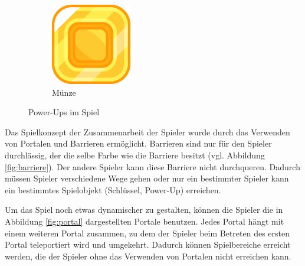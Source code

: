 \begin{figure}[H]
\begin{subfigure}[H]{0.15\textwidth}
        \includegraphics[width=\textwidth]{img/realisierung/assets/coin}
        \caption{Münze}
        \label{fig:coin}
    \end{subfigure}
    \caption{Power-Ups im Spiel}
    \label{fig:eatandcoin}
\end{figure}

Das Spielkonzept der Zusammenarbeit der Spieler wurde durch das Verwenden von Portalen und Barrieren ermöglicht. Barrieren sind nur für den Spieler durchlässig, der die selbe Farbe wie die Barriere besitzt (vgl. Abbildung \ref{fig:barriere}). Der andere Spieler kann diese Barriere nicht durchqueren. Dadurch müssen Spieler verschiedene Wege gehen oder nur ein bestimmter Spieler kann ein bestimmtes Spielobjekt (Schlüssel, Power-Up) erreichen.

Um das Spiel noch etwas dynamischer zu gestalten, können die Spieler die in Abbildung \ref{fig:portal} dargestellten Portale benutzen. Jedes Portal hängt mit einem weiteren Portal zusammen, zu dem der Spieler beim Betreten des ersten Portal teleportiert wird und umgekehrt. Dadurch können Spielbereiche erreicht werden, die der Spieler ohne das Verwenden von Portalen nicht erreichen kann.


